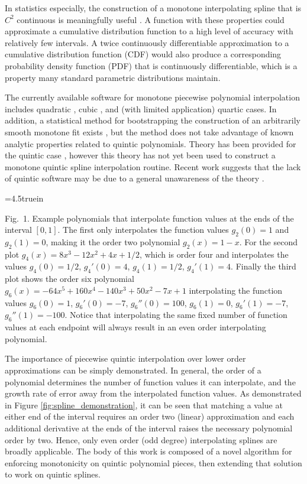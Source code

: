 In statistics especially, the construction of a monotone interpolating
spline that is $C^2$ continuous is meaningfully useful
\cite{ramsay1988monotone}. A function with these properties could
approximate a cumulative distribution function to a high level of
accuracy with relatively few intervals. A twice continuously
differentiable approximation to a cumulative distribution function
(CDF) would also produce a corresponding probability density function
(PDF) that is continuously differentiable, which is a property many
standard parametric distributions maintain.

The currently available software for monotone piecewise polynomial
interpolation includes quadratic \cite{he1998monotone}, cubic
\cite{fritsch1980monotone}, and (with limited application) quartic
\cite{wang2004rational,piah2011improved,yao2018unconditionally}
cases. In addition, a statistical method for bootstrapping the
construction of an arbitrarily smooth monotone fit exists
\cite{leitenstorfer2006generalized}, but the method does not take
advantage of known analytic properties related to quintic
polynomials. Theory has been provided for the quintic case
\cite{ulrich1994positivity,hess1994positive}, however this theory has
not yet been used to construct a monotone quintic spline interpolation
routine. Recent work suggests that the lack of quintic software may be
due to a general unawareness of the theory
\cite{xie2018semiparametric}.


\topinsert
\centerline{\epsfxsize=4.5truein }
{\narrower\noindent\rmVIII Fig.\ 1.
Example polynomials that interpolate function values at the ends of
the interval $[0,1]$. The first only interpolates the function values
$g_2(0) = 1$ and $g_2(1) = 0$, making it the order two polynomial
$g_2(x) = 1 - x$. For the second plot $g_4(x) = 8x^3 - 12x^2 + 4x +
1/2$, which is order four and interpolates the values $g_4(0) = 1/2$,
$g_4'(0) = 4$, $g_4(1) = 1/2$, $g_4'(1) = 4$. Finally the third plot
shows the order six polynomial $g_6(x) = - 64x^5 + 160x^4 - 140x^3 +
50x^2 - 7x + 1$ interpolating the function values $g_6(0) = 1$,
$g_6'(0) = -7$, $g_6''(0) = 100$, $g_6(1) = 0$, $g_6'(1) = -7$,
$g_6''(1) = -100$. Notice that interpolating the same fixed number of
function values at each endpoint will always result in an even order
interpolating polynomial.
\par}
\endinsert

The importance of piecewise quintic interpolation over lower order
approximations can be simply demonstrated. In general, the order of a
polynomial determines the number of function values it can
interpolate, and the growth rate of error away from the interpolated
function values. As demonstrated in Figure
\ref{fig:spline_demonstration}, it can be seen that matching a value
at either end of the interval requires an order two (linear)
approximation and each additional derivative at the ends of the
interval raises the necessary polynomial order by two. Hence, only
even order (odd degree) interpolating splines are broadly
applicable. The body of this work is composed of a novel algorithm for
enforcing monotonicity on quintic polynomial pieces, then extending
that solution to work on quintic splines.

